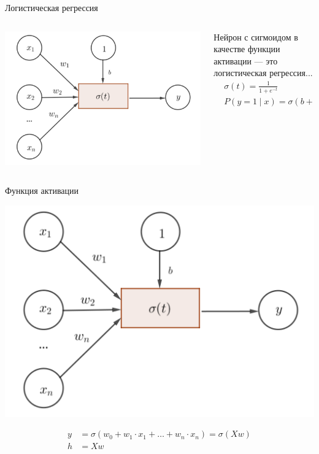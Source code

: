 \documentclass[notes,12pt, aspectratio=169]{beamer}
\begin{document}
\begin{frame}{Логистическая регрессия}
\begin{columns}[T] 
	\begin{column}{.45\textwidth}
		\begin{center}
			\includegraphics[width=0.99\linewidth]{neuron_3.png}
		\end{center}
	\end{column}%
	\hfill%
	\begin{column}{.55\textwidth}
		Нейрон с сигмоидом в качестве функции активации — это логистическая регрессия... 
		\begin{equation*}
		\begin{aligned}
		& \sigma(t) = \frac{1}{1 + e^{-t}} \\
		& P(y = 1 \mid x) = \sigma(b + w_1 x_1 + \ldots + w_n x_n) \\
		\end{aligned}
		\end{equation*}
	\end{column}%
\end{columns}
\end{frame}


\begin{frame}{Функция активации}
\begin{center}
	\includegraphics[width=0.51\linewidth]{neuron_3.png}
\end{center}
\begin{equation*}
\begin{aligned}
y &= \sigma(w_0 + w_1 \cdot x_1 + \ldots + w_n \cdot x_n) = \sigma(X w) \\ 
h & = X w
\end{aligned}
\end{equation*}
\end{frame}
\end{document}
